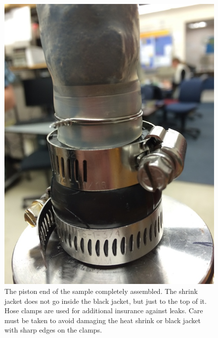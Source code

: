 \begin{figure}
	\centering
        \includegraphics[scale=0.7]{appendix_sample_prep/seal_detail.jpg}
   	\caption{The piston end of the sample completely assembled.  The shrink jacket does not go inside the black jacket, but just to the top of it.  Hose clamps are used for additional insurance against leaks.  Care must be taken to avoid damaging the heat shrink or black jacket with sharp edges on the clamps.}
  	\label{seal_detail}
\end{figure}

